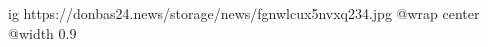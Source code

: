  
 
 
 
 

\ifcmt
  ig https://donbas24.news/storage/news/fgnwlcux5nvxq234.jpg
  @wrap center
  @width 0.9
\fi
